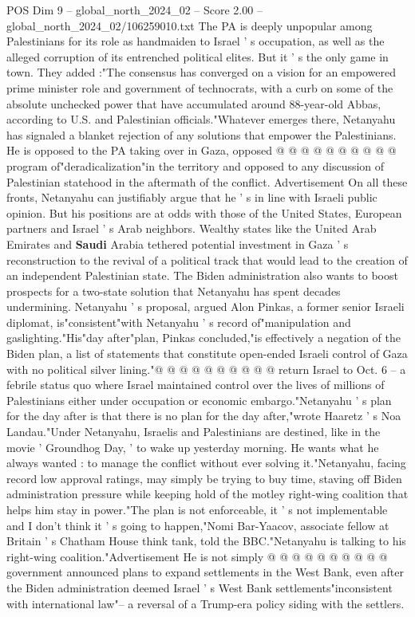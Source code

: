 \begin{textsample}{POS Dim 9 – global\_north\_2024\_02 – Score 2.00 – global\_north\_2024\_02/106259010.txt}
The PA is deeply unpopular among Palestinians for its role as handmaiden to Israel ' s occupation, as well as the alleged corruption of its entrenched political elites.
But it ' s the only game in town.
They added :"The consensus has converged on a vision for an empowered prime minister role and government of technocrats, with a curb on some of the absolute unchecked power that have accumulated around 88-year-old Abbas, according to U.S. and Palestinian officials."Whatever emerges there, Netanyahu has signaled a blanket rejection of any solutions that empower the Palestinians.
He is opposed to the PA taking over in Gaza, opposed @ @ @ @ @ @ @ @ @ @ program of"deradicalization"in the territory and opposed to any discussion of Palestinian statehood in the aftermath of the conflict.
Advertisement On all these fronts, Netanyahu can justifiably argue that he ' s in line with Israeli public opinion.
But his positions are at odds with those of the United States, European partners and Israel ' s Arab neighbors.
Wealthy states like the United Arab Emirates and \textbf{Saudi} Arabia tethered potential investment in Gaza ' s reconstruction to the revival of a political track that would lead to the creation of an independent Palestinian state.
The Biden administration also wants to boost prospects for a two-state solution that Netanyahu has spent decades undermining.
Netanyahu ' s proposal, argued Alon Pinkas, a former senior Israeli diplomat, is"consistent"with Netanyahu ' s record of"manipulation and gaslighting."His"day after"plan, Pinkas concluded,"is effectively a negation of the Biden plan, a list of statements that constitute open-ended Israeli control of Gaza with no political silver lining."@ @ @ @ @ @ @ @ @ @ return Israel to Oct. 6 -- a febrile status quo where Israel maintained control over the lives of millions of Palestinians either under occupation or economic embargo."Netanyahu ' s plan for the day after is that there is no plan for the day after,"wrote Haaretz ' s Noa Landau."Under Netanyahu, Israelis and Palestinians are destined, like in the movie ' Groundhog Day, ' to wake up yesterday morning.
He wants what he always wanted : to manage the conflict without ever solving it."Netanyahu, facing record low approval ratings, may simply be trying to buy time, staving off Biden administration pressure while keeping hold of the motley right-wing coalition that helps him stay in power."The plan is not enforceable, it ' s not implementable and I don't think it ' s going to happen,"Nomi Bar-Yaacov, associate fellow at Britain ' s Chatham House think tank, told the BBC."Netanyahu is talking to his right-wing coalition."Advertisement He is not simply @ @ @ @ @ @ @ @ @ @ government announced plans to expand settlements in the West Bank, even after the Biden administration deemed Israel ' s West Bank settlements"inconsistent with international law"-- a reversal of a Trump-era policy siding with the settlers.

\end{textsample}
